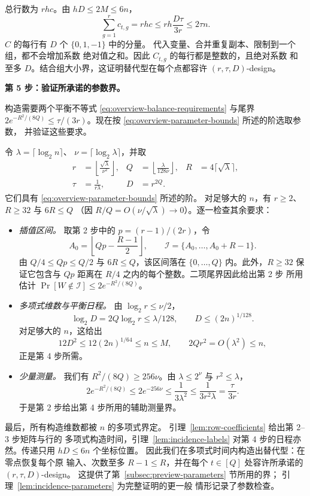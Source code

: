 总行数为 $rhc$。由 $hD\le2M\le6n$，
\[
 \sum_{g=1}^r c_{t,g}
 =rhc\le rh\frac{D\tau}{3r}\le2\tau n.
\]
$C$ 的每行有 $D$ 个 $\{0,1,-1\}$ 中的分量。
代入变量、合并重复副本、限制到一个组，都不会增加系数
绝对值之和。因此 $C_{t,g}$ 的每行都是整数的，且绝对系数
和至多 $D$。结合组大小界，这证明替代型在每个点都容许
$(r,\tau,D)$-design。

\medskip\noindent
\textbf{第 5 步：验证所承诺的参数界。}\par\nobreak
\smallskip\noindent
构造需要两个平衡不等式
\eqref{eq:overview-balance-requirements} 与尾界
$2e^{-R^2/(8Q)}\le\tau/(3r)$。现在按
\eqref{eq:overview-parameter-bounds} 所述的阶选取参数，
并验证这些要求。

令 $\lambda=\lceil\log_2 n\rceil$、
$\nu=\lceil\log_2\lambda\rceil$，并取
\begin{equation}\label{eq:overview-explicit-parameters}
 \begin{aligned}
 r&=\left\lfloor\frac{\sqrt\lambda}{\nu^2}\right\rfloor,
 &Q&=\left\lfloor\frac{\lambda}{128\nu}\right\rfloor,
 &R&=4\lceil\sqrt\lambda\rceil,\\
 \tau&=\frac1{r\lambda},
 &D&=r^{2Q}.
 \end{aligned}
\end{equation}
它们具有 \eqref{eq:overview-parameter-bounds} 所述的阶。
对足够大的 $n$，有 $r\ge2$、$R\ge32$ 与 $6R\le Q$
（因 $R/Q=O(\nu/\sqrt\lambda)\to0$）。逐一检查其余要求：
\begin{itemize}
\item \emph{插值区间。}
取第 2 步中的 $p=(r-1)/(2r)$，令
\[
 A_0=\left\lfloor Qp-\frac{R-1}{2}\right\rfloor,\qquad
 \mathcal I=\{A_0,\ldots,A_0+R-1\}.
\]
由 $Q/4\le Qp\le Q/2$ 与 $6R\le Q$，该区间落在
$\{0,\ldots,Q\}$ 内。此外，$R\ge32$ 保证它包含与 $Qp$
距离在 $R/4$ 之内的每个整数。二项尾界因此给出第 2 步
所用估计 $\Pr[W\notin\mathcal I]\le2e^{-R^2/(8Q)}$。
\item \emph{多项式维数与平衡日程。}
由 $\log_2 r\le\nu/2$，
\[
 \log_2 D=2Q\log_2 r\le\lambda/128,\qquad
 D\le(2n)^{1/128}.
\]
对足够大的 $n$，这给出
\[
 12D^2\le12(2n)^{1/64}\le n\le M,\qquad
 2Qr^2=O(\lambda^2)\le n,
\]
正是第 4 步所需。
\item \emph{少量测量。}
我们有 $R^2/(8Q)\ge256\nu$。由 $\lambda\le2^\nu$ 与
$r^2\le\lambda$，
\[
 2e^{-R^2/(8Q)}\le2e^{-256\nu}
 \le\frac1{3\lambda^2}
 \le\frac1{3r^2\lambda}=\frac{\tau}{3r}.
\]
于是第 2 步给出第 4 步所用的辅助测量界。
\end{itemize}

最后，所有构造维数都被 $n$ 的多项式界定。
引理~\ref{lem:row-coefficients} 给出第 2--3 步矩阵与行的
多项式构造时间，引理~\ref{lem:incidence-labels}
对第 4 步的日程亦然。传递只用 $hD\le6n$ 个坐标位置。
因此我们在多项式时间内构造出替代型：在零点恢复每个原
输入、次数至多 $R-1\le R$，并在每个 $t\in[Q]$
处容许所承诺的 $(r,\tau,D)$-design。
这提供了第~\ref{subsec:preview-parameters} 节所用的界；
引理~\ref{lem:incidence-parameters} 为完整证明的更一般
情形记录了参数检查。

